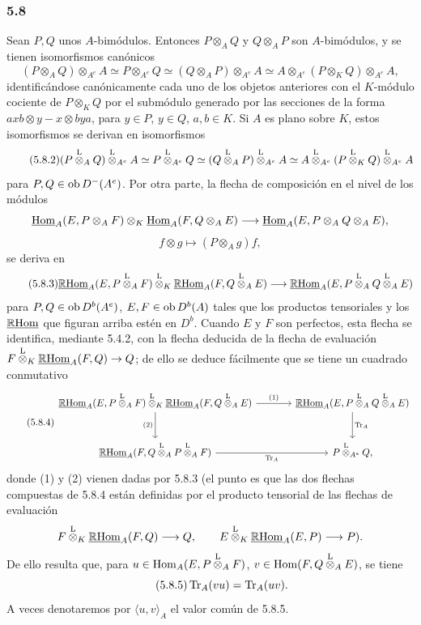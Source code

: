 \subsubsection*{5.8}

Sean $P,Q$ unos $A$-bimódulos. Entonces $P\otimes_AQ$ y $Q\otimes_AP$ son $A$-bimódulos, y se tienen isomorfismos canónicos
\begin{equation}\tag{5.8.1}
(P\otimes_AQ)\otimes_{A^e}A\simeq P\otimes_{A^e}Q\simeq(Q\otimes_AP)\otimes_{A^e}A\simeq A\otimes_{A^e}(P\otimes_KQ)\otimes_{A^e}A,
\end{equation}
identificándose canónicamente cada uno de los objetos anteriores con el $K$-módulo cociente de $P\otimes_KQ$ por el submódulo generado por las secciones de la forma $axb\otimes y-x\otimes bya$, para $y\in P$, $y\in Q$, $a,b\in K$. Si $A$ es plano sobre $K$, estos isomorfismos se derivan en isomorfismos
\begin{equation}\tag{5.8.2}
(P\overset{\mathrm L}{\otimes}_AQ)\overset{\mathrm L}{\otimes}_{A^e}A\simeq P\overset{\mathrm L}{\otimes}_{A^e}Q\simeq(Q\overset{\mathrm L}{\otimes}_AP)\overset{\mathrm L}{\otimes}_{A^e}A\simeq A\overset{\mathrm L}{\otimes}_{A^e}(P\overset{\mathrm L}{\otimes}_KQ)\overset{\mathrm L}{\otimes}_{A^e}A
\end{equation}
para $P,Q\in\operatorname{ob} D^-(A^e)$. Por otra parte, la flecha de composición en el nivel de los módulos
\[
\underline{\operatorname{Hom}}_A(E,P\otimes_AF)\otimes_K\underline{\operatorname{Hom}}_A(F,Q\otimes_AE)
\longrightarrow\underline{\operatorname{Hom}}_A(E,P\otimes_AQ\otimes_AE),
\]
\[
f\otimes g\longmapsto (P\otimes_Ag)f,
\]
se deriva en
\begin{equation}\tag{5.8.3}
\underline{\mathbb{R}\mathrm{Hom}}_A(E,P\overset{\mathrm L}{\otimes}_AF)\overset{\mathrm L}{\otimes}_K\underline{\mathbb{R}\mathrm{Hom}}_A(F,Q\overset{\mathrm L}{\otimes}_AE)
\longrightarrow\underline{\mathbb{R}\mathrm{Hom}}_A(E,P\overset{\mathrm L}{\otimes}_AQ\overset{\mathrm L}{\otimes}_AE)
\end{equation}
para $P,Q\in\operatorname{ob} D^b(A^e)$, $E,F\in\operatorname{ob} D^b(A)$ tales que los productos tensoriales y los $\underline{\mathbb{R}\mathrm{Hom}}$ que figuran arriba estén en $D^b$. Cuando $E$ y $F$ son perfectos, esta flecha se identifica, mediante 5.4.2, con la flecha deducida de la flecha de evaluación $F\overset{\mathrm L}{\otimes}_K\underline{\mathbb{R}\mathrm{Hom}}_A(F,Q)\to Q$; de ello se deduce fácilmente que se tiene un cuadrado conmutativo
\begin{equation}\tag{5.8.4}
\begin{tikzcd}[column sep=large,row sep=large]
\uRHom_A(E,P\lten_AF)\lten_K\uRHom_A(F,Q\lten_AE) \arrow[r,"(1)"] \arrow[d,"(2)"'] & \uRHom_A(E,P\lten_AQ\lten_AE) \arrow[d,"\Tr_A"]\\
\uRHom_A(F,Q\lten_AP\lten_AF) \arrow[r,"\Tr_A"'] & P\lten_{A^e}Q,
\end{tikzcd}
\end{equation}
donde (1) y (2) vienen dadas por 5.8.3 (el punto es que las dos flechas compuestas de 5.8.4 están definidas por el producto tensorial de las flechas de evaluación
\[
F\overset{\mathrm L}{\otimes}_K\underline{\mathbb{R}\mathrm{Hom}}_A(F,Q)\longrightarrow Q,\qquad
E\overset{\mathrm L}{\otimes}_K\underline{\mathbb{R}\mathrm{Hom}}_A(E,P)\longrightarrow P).
\]
De ello resulta que, para $u\in\operatorname{Hom}_A(E,P\overset{\mathrm L}{\otimes}_AF)$, $v\in\operatorname{Hom}(F,Q\overset{\mathrm L}{\otimes}_AE)$, se tiene
\begin{equation}\tag{5.8.5}
\operatorname{Tr}_A(vu)=\operatorname{Tr}_A(uv).
\end{equation}
A veces denotaremos por $\langle u,v\rangle_A$ el valor común de 5.8.5.
